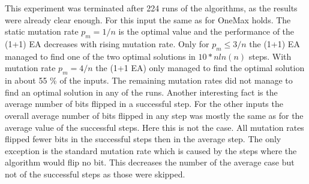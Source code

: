 This experiment was terminated after 224 runs of the algorithms, as the results were already clear enough.
For this input the same as for OneMax holds. 
The static mutation rate $p_m=1/n$ is the optimal value and the performance of the (1+1) EA decreases with rising mutation rate.
Only for $p_m\le3/n$ the (1+1) EA managed to find one of the two optimal solutions in $10*nln(n)$ steps.
With mutation rate $p_m=4/n$ the (1+1 EA) only managed to find the optimal solution in about 55 \% of the inputs.
The remaining mutation rates did not manage to find an optimal solution in any of the runs.
Another interesting fact is the average number of bits flipped in a successful step.
For the other inputs the overall average number of bits flipped in any step was mostly the same as for the average value of the successful steps. Here this is not the case.
All mutation rates flipped fewer bits in the successful steps then in the average step.
The only exception is the standard mutation rate which is caused by the steps where the algorithm would flip no bit.
This decreases the number of the average case but not of the successful steps as those were skipped.